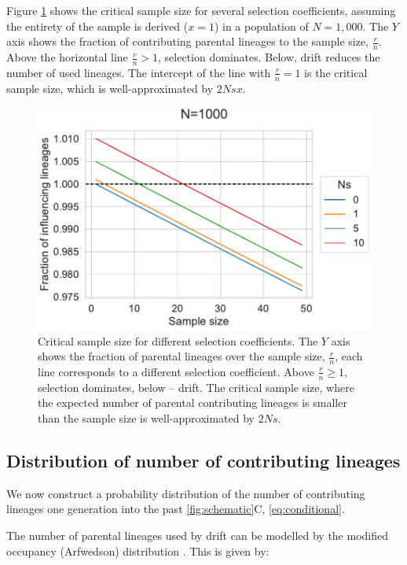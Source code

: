 \documentclass[review]{elsarticle}
\begin{document}
Figure \ref{fig:critical-sample-size} shows the critical sample size for several selection
coefficients, assuming the entirety of the sample is derived ($x=1$) in a population of $N=1,000$.
The $Y$ axis shows the fraction of contributing parental lineages to the sample size, $\frac{r}{n}$.
Above the horizontal line $\frac{r}{n} > 1$, selection dominates. Below, drift reduces the number of
used lineages. The intercept of the line with $\frac{r}{n} = 1$ is the critical sample size, which
is well-approximated by $2Nsx$.

\begin{figure}
  \centering
  \includegraphics{fig/critical_sample_size.pdf}
  \caption{Critical sample size for different selection coefficients. The $Y$ axis shows the
    fraction of parental lineages over the sample size, $\frac{r}{n}$, each line corresponds to a
    different selection coefficient. Above $\frac{r}{n}\ge 1$, selection dominates, below -- drift.
    The critical sample size, where the expected number of parental contributing lineages is smaller
    than the sample size is well-approximated by $2Ns$.}
  \label{fig:critical-sample-size}
\end{figure}

\subsection{Distribution of number of contributing lineages}
\label{subsec:distribution}

We now construct a probability distribution of the number of contributing lineages one generation
into the past \ref{fig:schematic}C, \eqref{eq:conditional}. 

The number of parental lineages used by drift can be modelled by the modified occupancy
(Arfwedson) distribution \citep{Wakeley2009,ONeill2019,JohnsonEtAl2005}. This is given by:
\end{document}
